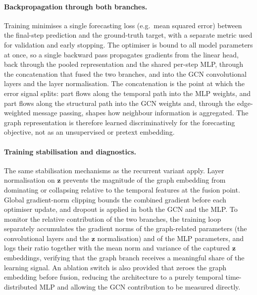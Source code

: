 \paragraph{Backpropagation through both branches.}
Training minimises a single forecasting loss (e.g.\ mean squared error) between
the final-step prediction and the ground-truth target, with a separate metric
used for validation and early stopping. The optimiser is bound to all model
parameters at once, so a single backward pass propagates gradients from the
linear head, back through the pooled representation and the shared per-step MLP,
through the concatenation that fused the two branches, and into the GCN
convolutional layers and the layer normalisation. The concatenation is the
point at which the error signal splits: part flows along the temporal path into
the MLP weights, and part flows along the structural path into the GCN weights
and, through the edge-weighted message passing, shapes how neighbour
information is aggregated. The graph representation is therefore learned
discriminatively for the forecasting objective, not as an unsupervised or
pretext embedding.

\paragraph{Training stabilisation and diagnostics.}
The same stabilisation mechanisms as the recurrent variant apply. Layer
normalisation on $\mathbf{z}$ prevents the magnitude of the graph embedding
from dominating or collapsing relative to the temporal features at the fusion
point. Global gradient-norm clipping bounds the combined gradient before each
optimiser update, and dropout is applied in both the GCN and the MLP. To
monitor the relative contribution of the two branches, the training loop
separately accumulates the gradient norms of the graph-related parameters
(the convolutional layers and the $\mathbf{z}$ normalisation) and of the MLP
parameters, and logs their ratio together with the mean norm and variance of
the captured $\mathbf{z}$ embeddings, verifying that the graph branch receives
a meaningful share of the learning signal. An ablation switch is also provided
that zeroes the graph embedding before fusion, reducing the architecture to a
purely temporal time-distributed MLP and allowing the GCN contribution to be
measured directly.

